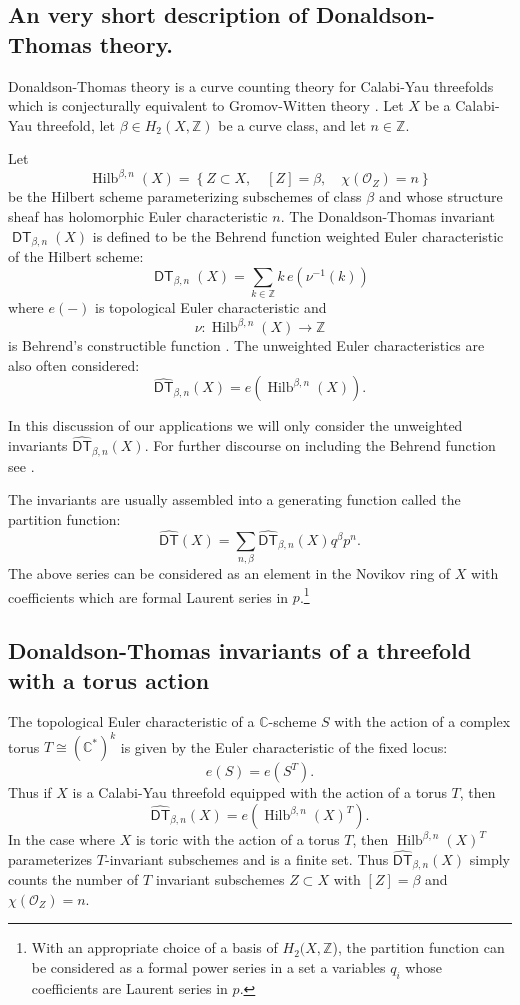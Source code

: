 \documentclass[12pt]{amsart}
\newcommand{\cnums} {{\mathbb C}}          %
\newcommand{\znums} {{\mathbb Z}}		%
\theoremstyle{definition}
\renewcommand{\O}{\mathcal{O}}
\newcommand{\DT}{\operatorname{\mathsf{DT}}}
\newcommand{\DThat}{\operatorname{\widehat{\mathsf{DT}}}}
\newcommand{\HilbBetan}{\operatorname{Hilb}^{\beta ,n}}
\begin{document}
\subsection{An very short description of Donaldson-Thomas theory.}

Donaldson-Thomas theory is a curve counting theory for Calabi-Yau
threefolds which is conjecturally equivalent to Gromov-Witten theory
\cite{MNOP1}. Let $X$ be a Calabi-Yau threefold, let $\beta \in
H_{2}(X,\znums )$ be a curve class, and let $n\in \znums$.

Let
\[
\HilbBetan (X) = \left\{Z\subset X,\quad [Z]=\beta ,\quad \chi (\O_{Z})=n \right\}
\]
be the Hilbert scheme parameterizing subschemes of class $\beta$ and
whose structure sheaf has holomorphic Euler characteristic $n$. The
Donaldson-Thomas invariant $\DT_{\beta ,n}(X)$ is defined to be the
Behrend function weighted Euler characteristic of the Hilbert scheme:
\[
\DT_{\beta ,n} (X)= \sum_{k\in \znums} k\, e\left( \nu^{-1}(k) \right)
\] 
where $e(-)$ is topological Euler characteristic and 
\[
\nu : \HilbBetan (X)\to \znums 
\]
is Behrend's constructible function \cite{Behrend-micro}. The
unweighted Euler characteristics are also often considered:
\[
\DThat_{\beta ,n} (X) = e\left(\HilbBetan (X) \right).
\]

In this discussion of our applications we will only consider the
unweighted invariants $\DThat_{\beta ,n}(X)$. For further discourse on
including the Behrend function see \cite{Bryan-K3xE,Bryan-Kool,BOPY}. 


The invariants are usually assembled into a generating function called
the partition function:
\[
\DThat (X) = \sum_{n,\beta} \DThat_{\beta ,n}(X) q^{\beta} p^{n}.
\]
The above series can be considered as an element in the Novikov
ring of $X$ with coefficients which are formal Laurent series in
$p$.\footnote{With an appropriate choice of a basis of
$H_{2}(X,\znums$), the partition function can be considered as a formal
power series in a set a variables $q_{i}$ whose coefficients are
Laurent series in $p$.}


\subsection{Donaldson-Thomas invariants of a threefold with a torus action}

The topological Euler characteristic of a $\cnums$-scheme $S$ with the
action of a complex torus $T \cong (\cnums^{*})^{k}$ is given by the
Euler characteristic of the fixed locus:
\[
e(S) = e\left(S^{T} \right).
\]
Thus if $X$ is a Calabi-Yau threefold equipped with the action of a
torus $T$, then
\[
\DThat_{\beta ,n}(X) = e\left(\HilbBetan (X)^{T} \right).
\]
In the case where $X$ is toric with the action of a torus $T$, then
$\HilbBetan (X)^{T}$ parameterizes $T$-invariant subschemes and is a
finite set. Thus $\DThat_{\beta ,n}(X)$ simply counts the number of
$T$ invariant subschemes $Z\subset X$ with $[Z]=\beta$ and $\chi
(\O_{Z})=n$.
\end{document}
